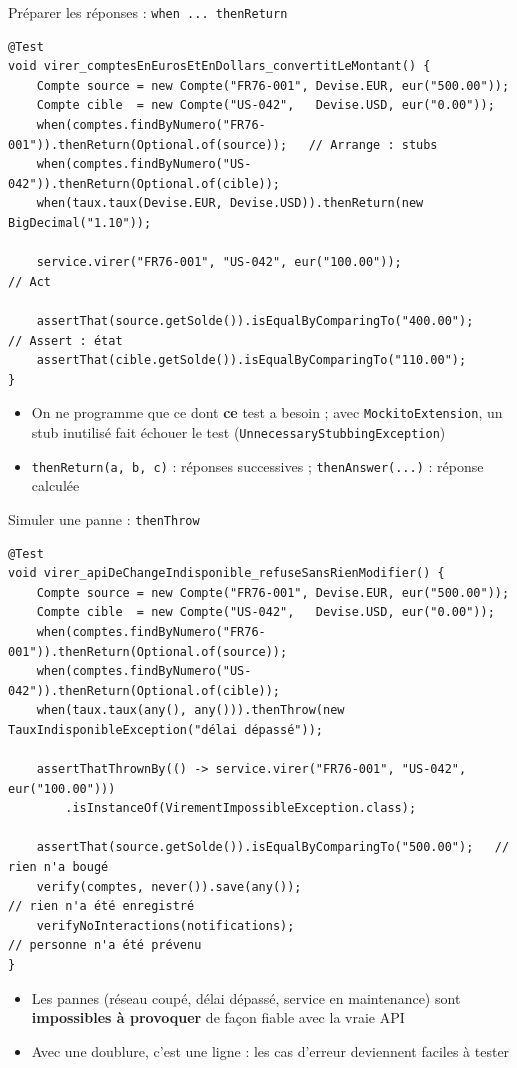 \documentclass[aspectratio=169,10pt]{beamer}
\begin{document}
\begin{frame}[fragile]{Préparer les réponses : \texttt{when ... thenReturn}}
\begin{lstlisting}[basicstyle=\lstcode\scriptsize]
@Test
void virer_comptesEnEurosEtEnDollars_convertitLeMontant() {
    Compte source = new Compte("FR76-001", Devise.EUR, eur("500.00"));
    Compte cible  = new Compte("US-042",   Devise.USD, eur("0.00"));
    when(comptes.findByNumero("FR76-001")).thenReturn(Optional.of(source));   // Arrange : stubs
    when(comptes.findByNumero("US-042")).thenReturn(Optional.of(cible));
    when(taux.taux(Devise.EUR, Devise.USD)).thenReturn(new BigDecimal("1.10"));

    service.virer("FR76-001", "US-042", eur("100.00"));                       // Act

    assertThat(source.getSolde()).isEqualByComparingTo("400.00");             // Assert : état
    assertThat(cible.getSolde()).isEqualByComparingTo("110.00");
}
\end{lstlisting}
  \begin{itemize}
    \item On ne programme que ce dont \textbf{ce} test a besoin ; avec \texttt{MockitoExtension}, un stub inutilisé fait échouer le test (\texttt{UnnecessaryStubbingException})
    \item \texttt{thenReturn(a, b, c)} : réponses successives ; \texttt{thenAnswer(...)} : réponse calculée
  \end{itemize}
\end{frame}

\begin{frame}[fragile]{Simuler une panne : \texttt{thenThrow}}
\begin{lstlisting}[basicstyle=\lstcode\scriptsize]
@Test
void virer_apiDeChangeIndisponible_refuseSansRienModifier() {
    Compte source = new Compte("FR76-001", Devise.EUR, eur("500.00"));
    Compte cible  = new Compte("US-042",   Devise.USD, eur("0.00"));
    when(comptes.findByNumero("FR76-001")).thenReturn(Optional.of(source));
    when(comptes.findByNumero("US-042")).thenReturn(Optional.of(cible));
    when(taux.taux(any(), any())).thenThrow(new TauxIndisponibleException("délai dépassé"));

    assertThatThrownBy(() -> service.virer("FR76-001", "US-042", eur("100.00")))
        .isInstanceOf(VirementImpossibleException.class);

    assertThat(source.getSolde()).isEqualByComparingTo("500.00");   // rien n'a bougé
    verify(comptes, never()).save(any());                            // rien n'a été enregistré
    verifyNoInteractions(notifications);                              // personne n'a été prévenu
}
\end{lstlisting}
  \begin{itemize}
    \item Les pannes (réseau coupé, délai dépassé, service en maintenance) sont \textbf{impossibles à provoquer} de façon fiable avec la vraie API
    \item Avec une doublure, c'est une ligne : les cas d'erreur deviennent faciles à tester
  \end{itemize}
\end{frame}
\end{document}

